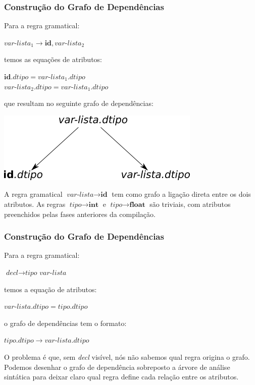 \documentclass[table]{beamer}
\begin{document}
\begin{frame}
   \frametitle{Construção do Grafo de Dependências}
   Para a regra gramatical:
   \begin{center}
   $\textit{var-lista}_{1} \to \textbf{id},\textit{var-lista}_{2}$ 
   \end{center}
   temos as equações de atributos: 
   \begin{center}
   $\textbf{id}.dtipo = \textit{var-lista}_{1}.dtipo$ \\
   $\textit{var-lista}_{2}.dtipo = \textit{var-lista}_{1}.dtipo$ \\
   \end{center}
   que resultam no seguinte grafo de dependências: \\
   \begin{center}
   \includegraphics[scale=0.5]{figuras/exemplo67.png}
   \end{center}
   A regra gramatical $\textit{var-lista}\to\textbf{id}$ tem como grafo a ligação direta entre os dois atributos. As regras $\textit{tipo}\to\textbf{int}$ e $\textit{tipo}\to\textbf{float}$ são triviais, com atributos preenchidos pelas fases anteriores da compilação.
\end{frame}

\begin{frame}
   \frametitle{Construção do Grafo de Dependências}
   Para a regra gramatical:
   \begin{center}
   $\textit{decl} \to \textit{tipo }\textit{var-lista}$ 
   \end{center}
   temos a equação de atributos: 
   \begin{center}
   $\textit{var-lista}.dtipo = \textit{tipo}.dtipo$ 
   \end{center}
   o grafo de dependências tem o formato:
   \begin{center}
   $tipo.dtipo\longrightarrow  \textit{var-lista}.dtipo$ 
   \end{center}
   O problema é que, sem \textit{decl} visível, nós não sabemos qual regra origina o grafo. Podemos desenhar o grafo de dependência sobreposto a árvore de análise sintática para deixar claro qual regra define cada relação entre os atributos.
\end{frame}
\end{document}
